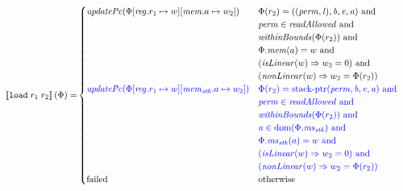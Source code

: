 \documentclass[a4paper]{article}
\newcommand{\sem}[1]{\left\llbracket #1 \right\rrbracket}
\newcommand{\dom}{\mathrm{dom}}
\newcommand{\tand}{\text{ and }}
\newcommand{\totherwise}{\text{otherwise }}
\newcommand{\sourcecolor}[1]{\color{blue}}
\newcommand{\src}[1]{{\sourcecolor{} #1}}
\newcommand{\targetcolor}[1]{\color{black}}
\newcommand{\trg}[1]{{\targetcolor{} #1}}
\newcommand{\zinstr}[1]{\texttt{#1}}
\newcommand{\twoinstr}[3]{
  \ifthenelse{\equal{#2#3}{}}
  {\zinstr{#1}}
  {\zinstr{#1} \; #2 \; #3}
}
\newcommand{\tload}[2]{\twoinstr{\trg{load}}{#1}{#2}}
\newcommand{\update}[2]{[#1 \mapsto #2]}
\newcommand{\updReg}[2]{\update{\reg.#1}{#2}}
\newcommand{\perm}{\var{perm}}
\newcommand{\lin}{\var{l}}
\newcommand{\stkptr}[1]{\mathrm{stack\text{-}ptr}(#1)}
\newcommand{\failed}{\mathrm{failed}}
\newcommand{\var}[1]{\mathit{#1}}
\newcommand{\reg}{\var{reg}}
\newcommand{\mem}{\var{mem}}
\newcommand{\ms}{\var{ms}}
\newcommand{\stk}{\var{stk}}
\newcommand{\baddr}{\var{b}}
\newcommand{\eaddr}{\var{e}}
\newcommand{\aaddr}{\var{a}}
\newcommand{\plainfun}[2]{
  \ifthenelse{\equal{#2}{}}
  {\mathit{#1}}
  {\mathit{#1}(#2)}
}
\newcommand{\updPcAddr}[1]{\plainfun{updatePc}{#1}}
\newcommand{\readAllowed}[1]{\plainfun{readAllowed}{#1}}
\newcommand{\nonLinear}[1]{\plainfun{nonLinear}{#1}}
\newcommand{\isLinear}[1]{\plainfun{isLinear}{#1}}
\newcommand{\withinBounds}[1]{\plainfun{withinBounds}{#1}}
\begin{document}
\begin{align*}
  \sem{\tload{r_1}{r_2}}(\Phi) = & 
                                  \begin{cases}
                                    \updPcAddr{\Phi\updReg{r_1}{w}\update{\mem.a}{w_2}} & 
                                    \arraycolsep=0pt
                                    \begin{array}[t]{l}
                                      \Phi(r_2) = ((\perm,\lin),\baddr,\eaddr,\aaddr) \tand \\
                                      \perm \in \readAllowed{} \tand\\
                                      \withinBounds{\Phi(r_2)} \tand \\
                                      \Phi.\mem(a) = w \tand \\
                                      (\isLinear{w} \Rightarrow w_2 = 0) \tand \\
                                      (\nonLinear{w} \Rightarrow w_2 = \Phi(r_2))
                                    \end{array}
                                    \\
                                    \src{\updPcAddr{\Phi\updReg{r_1}{w}\update{\mem_\stk.a}{w_2}}} & 
                                    \arraycolsep=0pt
                                    \begin{array}[t]{l}
                                      \src{\Phi(r_2) = \stkptr{\perm,\baddr,\eaddr,\aaddr} \tand} \\
                                      \src{\perm \in \readAllowed{} \tand} \\
                                      \src{\withinBounds{\Phi(r_2)} \tand} \\
                                      \src{\aaddr \in \dom(\Phi.\ms_\stk) \tand} \\
                                      \src{\Phi.\ms_\stk(a) = w \tand} \\
                                      \src{(\isLinear{w} \Rightarrow w_2 = 0) \tand} \\
                                      \src{(\nonLinear{w} \Rightarrow w_2 = \Phi(r_2))}
                                    \end{array}
                                    \\
                                    \failed & \totherwise                                    
                                  \end{cases}
\end{align*} 
\end{document}
